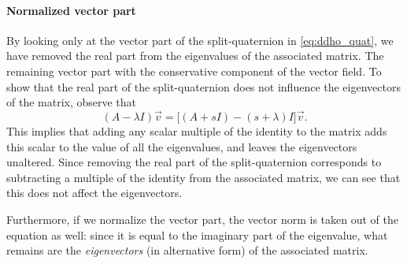 \paragraph{Normalized vector part} 
By looking only at the vector part of the split-quaternion in \cref{eq:ddho_quat}, we have removed the real part from the eigenvalues of the associated matrix. The remaining vector part with the conservative component of the vector field. To show that the real part of the split-quaternion does not influence the eigenvectors of the matrix, observe that
\begin{equation}
     (A - \lambda I)\vec{v} = \big[(A + s I)  - (s + \lambda) I\big]\vec{v}.
     \label{eq:eigvec_realpart}
\end{equation}
This implies that adding any scalar multiple of the identity to the matrix adds this scalar to the value of all the eigenvalues, and leaves the eigenvectors unaltered. Since removing the real part of the split-quaternion corresponds to subtracting a multiple of the identity from the associated matrix, we can see that this does not affect the eigenvectors.

Furthermore, if we normalize the vector part, the vector norm is taken out of the equation as well: since it is equal to the imaginary part of the eigenvalue, what remains are the \emph{eigenvectors} (in alternative form) of the associated matrix.

